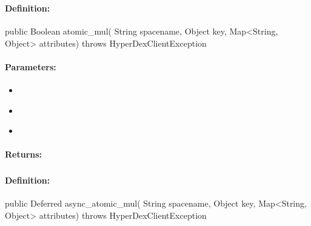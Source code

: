 \subsubsection{}
\label{api:java:atomic_mul}


\paragraph{Definition:}
\begin{javacode}
public Boolean atomic_mul(
        String spacename,
        Object key,
        Map<String, Object> attributes) throws HyperDexClientException
\end{javacode}

\paragraph{Parameters:}
\begin{itemize}[noitemsep]
\item {}\\

\item {}\\

\item {}\\

\end{itemize}

\paragraph{Returns:}


\pagebreak
\subsubsection{}
\label{api:java:async_atomic_mul}


\paragraph{Definition:}
\begin{javacode}
public Deferred async_atomic_mul(
        String spacename,
        Object key,
        Map<String, Object> attributes) throws HyperDexClientException
\end{javacode}

